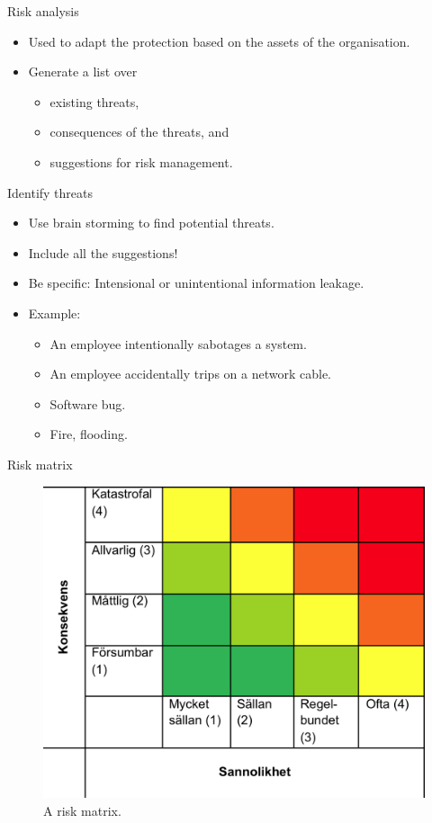 \documentclass{beamer}
\begin{document}
\begin{frame}{Risk analysis}
  \begin{itemize}
    \item Used to adapt the protection based on the assets of the organisation.
    \item Generate a list over
      \begin{itemize}
        \item existing threats,
        \item consequences of the threats, and
        \item suggestions for risk management.
      \end{itemize}
  \end{itemize}
\end{frame}

\begin{frame}{Identify threats}
  \begin{itemize}
    \item Use brain storming to find potential threats.
    \item Include all the suggestions!
    \item Be specific: Intensional or unintentional information leakage.
    \item Example:
      \begin{itemize}
        \item An employee intentionally sabotages a system.
        \item An employee accidentally trips on a network cable.
        \item Software bug.
        \item Fire, flooding.
      \end{itemize}
  \end{itemize}
\end{frame}

\begin{frame}{Risk matrix}
  \begin{figure}
    \includegraphics[height=0.7\textheight]{riskmatris.png}
    \caption{A risk matrix.}
  \end{figure}
\end{frame}
\end{document}
